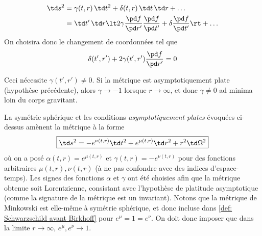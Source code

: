 \begin{align}
    \td s^2 &= \gamma (t,r) \,\td t^2 + \delta (t,r) \, \td t \, \td r + \dots\\
    &= \td t' \, \td r \lt 2 \gamma \frac{\pd f}{\pd r'} \frac{\pd f}{\pd t'} + \delta \frac{\pd f}{\pd t'}  \rt + \dots
\end{align}
On choisira donc le changement de coordonnées tel que 
\begin{equation}
    \delta (t',r') + 2 \gamma (t',r') \frac{\pd f}{\pd r'} = 0
\end{equation}
\begin{rmk}
    Ceci nécessite $\gamma(t',r') \neq 0$. Si la métrique est asymptotiquement plate (hypothèse précédente), alors $\gamma \to -1$ lorsque $r\to \infty$, et donc $\gamma \neq 0$ ad minima loin du corps gravitant.
\end{rmk}
La symétrie sphérique et les conditions \emph{asymptotiquement plates} évoquées ci-dessus amènent la métrique à la forme
\begin{equation}
\label{def: Schwarzschild avant Birkhoff}
    \boxed{\td s^2 = - e^{\nu(t,r)} \td t^2 + e^{\mu(t,r)} \td r^2 + r^2 \td \Omega^2}
\end{equation}
où on a posé $\alpha(t,r) = e^{\mu (t,r)}$ et $\gamma (t,r) = - e^{\nu (t,r)}$ pour des fonctions arbitraires $\mu (t,r), \nu (t,r)$ (à ne pas confondre avec des indices d'espace-temps). Les signes des fonctions $\alpha$ et $\gamma$ ont été choisies afin que la métrique obtenue soit Lorentzienne, consistant avec l'hypothèse de platitude asymptotique (comme la signature de la métrique est un invariant). Notons que la métrique de Minkowski est elle-même à symétrie sphérique, et donc incluse dans \ref{def: Schwarzschild avant Birkhoff} pour $e^\mu = 1 = e^\nu$. On doit donc imposer que dans la limite $r \to \infty$, $e^\mu, e^\nu \to 1$.
